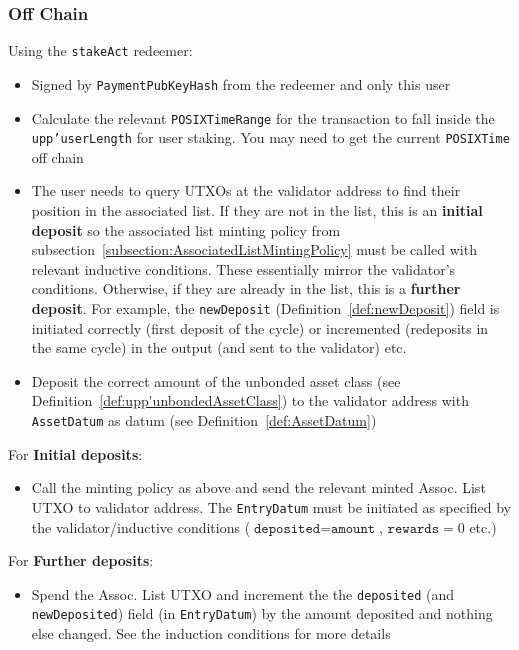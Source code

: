 \documentclass[10pt, a4paper]{article}
\theoremstyle{definition}
\begin{document}
\subsubsection{Off Chain}\label{subsubsection:userStakeOffchain}
Using the \texttt{stakeAct} redeemer:
\begin{itemize}
\item{Signed by \texttt{PaymentPubKeyHash} from the redeemer and only this user}
\item{Calculate the relevant \texttt{POSIXTimeRange} for the transaction to fall inside the \texttt{upp'userLength} for user staking. You may need to get the current \texttt{POSIXTime} off chain}
\item{The user needs to query UTXOs at the validator address to find their position in the associated list. If they are not in the list, this is an \textbf{initial deposit} so the associated list minting policy from subsection~\ref{subsection:AssociatedListMintingPolicy} must be called with relevant inductive conditions. These essentially mirror the validator's conditions. Otherwise, if they are already in the list, this is a \textbf{further deposit}. For example, the \texttt{newDeposit} (Definition~\ref{def:newDeposit}) field is initiated correctly (first deposit of the cycle) or incremented (redeposits in the same cycle) in the output (and sent to the validator) etc.}
\item{Deposit the correct amount of the unbonded asset class (see Definition~\ref{def:upp'unbondedAssetClass}) to the validator address with \texttt{AssetDatum} as datum (see Definition~\ref{def:AssetDatum})}
\end{itemize}
For \textbf{Initial deposits}:
\begin{itemize}
\item{Call the minting policy as above and send the relevant minted Assoc. List UTXO to validator address. The \texttt{EntryDatum} must be initiated as specified by the validator/inductive conditions ($\texttt{deposited} = \texttt{amount}$, $\texttt{rewards} = 0$ etc.)}
\end{itemize}
For \textbf{Further deposits}:
\begin{itemize}
\item{Spend the Assoc. List UTXO and increment the the \texttt{deposited} (and \texttt{newDeposited}) field (in \texttt{EntryDatum}) by the amount deposited and nothing else changed. See the induction conditions for more details}
\end{itemize}
\end{document}
